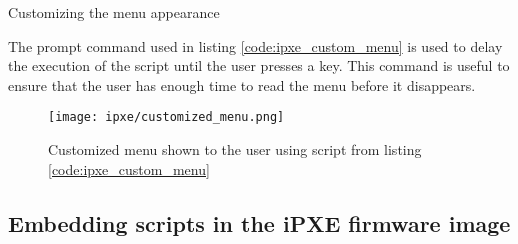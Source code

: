 \documentclass[../main.tex]{subfiles}
\begin{document}
\begin{listing}[H]
  \caption{Customizing the menu appearance}
  \label{code:ipxe_custom_menu}
\end{listing}

The prompt command used in listing \ref{code:ipxe_custom_menu} is used to delay the execution of the script until the user presses a key.
This command is useful to ensure that the user has enough time to read the menu before it disappears.

\begin{figure}[H]
  \centering
  \texttt{[image: ipxe/customized\_menu.png]}
  \caption{Customized menu shown to the user using script from listing \ref{code:ipxe_custom_menu}}
  \label{fig:ipxe_custom_menu}
\end{figure}

\subsection{Embedding scripts in the iPXE firmware image}


\end{document}
